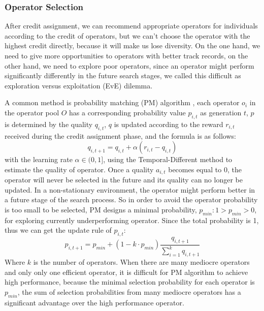 \documentclass[journal]{IEEEtran}
\begin{document}
\subsubsection{Operator Selection}
After credit assignment, we can recommend appropriate operators for individuals according to the credit of operators, but we can't choose the operator with the highest credit directly, because it will make us lose diversity. On the one hand, we need to give more opportunities to operators with better track records, on the other hand, we need to explore poor operators, since an operator might perform significantly differently in the future search stages, we called this difficult as exploration versus exploitation (EvE) dilemma.

A common method is probability matching (PM) algorithm \cite{thierens2007adaptive}, each operator $o_i$ in the operator pool $O$ has a corresponding probability value $p_{i,t}$ as generation $t$, $p$ is determined by the quality $q_{i,t}$, $q$ is updated according to the reward $r_{i,t}$ received during the credit assignment phase, and the formula is as follows:
\begin{equation}
  q_{i,t+1} = q_{i,t} + \alpha(r_{i,t} - q_{i,t})
  \label{eq: pm_q}
\end{equation}
with the learning rate $\alpha \in (0,1]$, using the Temporal-Different method to estimate the quality of operator.
Once a quality $a_{i,t}$ becomes equal to 0, the operator will never be selected in the future and its quality can no longer be updated.
In a non-stationary environment, the operator might perform better in a future stage of the search process.
So in order to avoid the operator probability is too small to be selected, PM designs a minimal probability, $p_{min}: 1 > p_{min} > 0$, for exploring currently underperforming operator. Since the total probability is 1, thus we can get the update rule of $p_{i,t}$:
\begin{equation}
  p_{i,t+1} = p_{min} + (1-k \cdot p_{min}) \frac{q_{i,t+1}}{\sum_{i=1}^k q_{i,t+1}}
  \label{eq: pm_p}
\end{equation}
Where $k$ is the number of operators.
When there are many mediocre operators and only only one efficient operator, it is difficult for PM algorithm to achieve high performance, because the minimal selection probability for each operator is $p_{min}$, the sum of selection probabilities from many mediocre operators has a significant advantage over the high performance operator.
\end{document}
